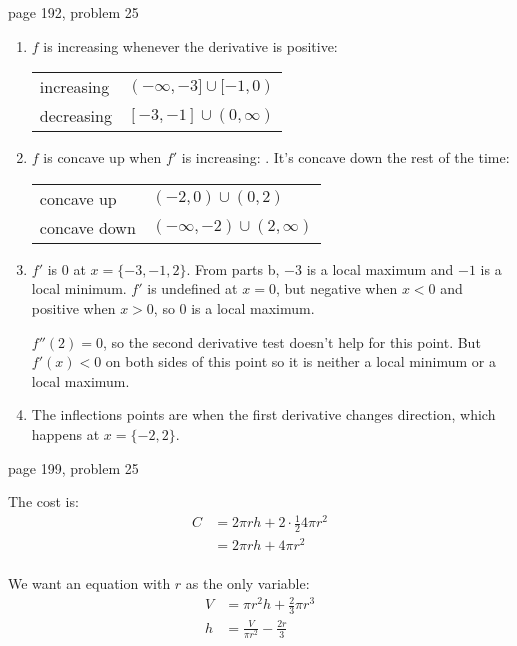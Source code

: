 \documentclass[fleqn]{exam}
\begin{document}
\begin{itemize*}
  \item page 192, problem 25
\begin{solution}
\begin{enumerate}[a]

\item $f$ is increasing whenever the derivative is positive: 

\begin{tabular}{ll}
\toprule
increasing & $(-\infty, -3] \cup [-1, 0)$ \\
decreasing & $[-3, -1] \cup (0, \infty)$ \\
\bottomrule
\end{tabular}

\item $f$ is concave up when $f'$ is increasing: .  It's concave down the rest of the time:

\begin{tabular}{ll}
\toprule
concave up   & $(-2, 0) \cup (0, 2)$ \\
concave down & $(-\infty, -2) \cup (2, \infty)$ \\
\bottomrule
\end{tabular}

\item $f'$ is 0 at $x = \{-3, -1, 2 \}$.  From parts b, $-3$ is a local maximum and $-1$ is a local minimum.  $f'$ is
  undefined at $x = 0$, but negative when $x < 0$ and positive when $x > 0$, so $0$ is a local maximum.

$f''(2) = 0$, so the second derivative test doesn't help for this point.  But $f'(x) < 0$ on both sides of this point so
  it is neither a local minimum or a local maximum.

\item The inflections points are when the first derivative changes direction, which happens at $x = \{-2, 2 \}.$

\end{enumerate}
\end{solution}
  \item page 199, problem 25
\begin{solution}
The cost is:
\begin{align*}
  C &= 2 \pi r h + 2 \cdot \frac{1}{2} 4 \pi r^2 \\
    &= 2 \pi r h + 4 \pi r^2 \\
\end{align*}

We want an equation with $r$ as the only variable:
\begin{align*}
  V &= \pi r^2 h + \frac{2}{3} \pi r^3 \\
  h &= \frac{V}{\pi r^2} - \frac{2r}{3} \\
\end{align*}


\end{solution}
\end{itemize*}
\end{document}
